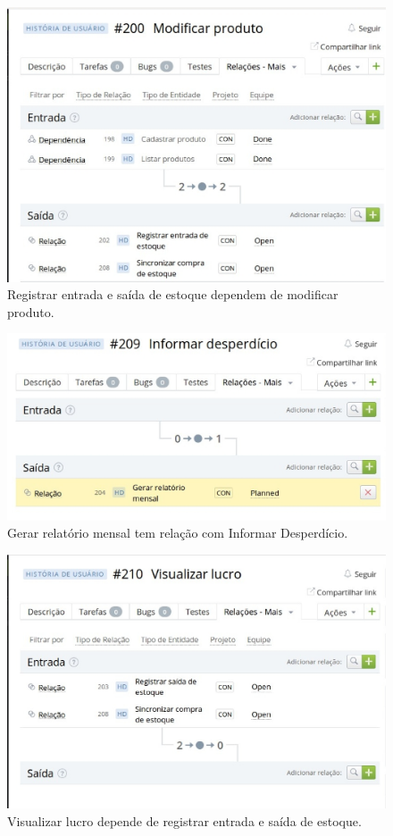 \begin{figure}[!htpb]
\centering
\includegraphics[scale=0.45]{figuras/gerenciamento/foto_4_}
\caption{Registrar entrada e saída de estoque dependem de modificar produto.}
\end{figure}

\begin{figure}[!htpb]
\centering
\includegraphics[scale=0.45]{figuras/gerenciamento/foto_5_}
\caption{Gerar relatório mensal tem relação com Informar Desperdício.}
\end{figure}

\begin{figure}[!htpb]
\centering
\includegraphics[scale=0.45]{figuras/gerenciamento/foto_6_}
\caption{Visualizar lucro depende de registrar entrada e saída de estoque.}
\end{figure}